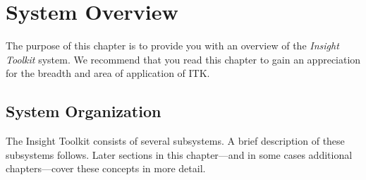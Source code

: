 \chapter{System Overview}%
\label{chapter:SystemOverview}

The purpose of this chapter is to provide you with an overview of the
\emph{Insight Toolkit} system. We recommend that you read this chapter to
gain an appreciation for the breadth and area of application of ITK.

\section{System Organization}%
\label{sec:SystemOrganization}

The Insight Toolkit consists of several subsystems. A brief
description of these subsystems follows. Later sections in this chapter---and
in some cases additional chapters---cover these concepts in more detail.

